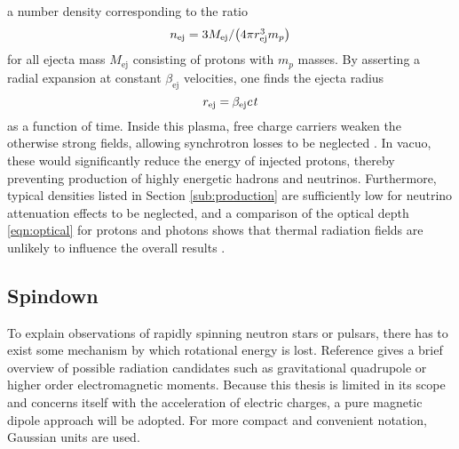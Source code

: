 a number density corresponding to the ratio
\begin{equation}
	\cramped{n_\text{ej} = 3 M_\text{ej} / \bigl( 4\pi r_\text{ej}^3 m_p \bigr)} \kern+0.5pt
	\label{eqn:number-density}
\end{equation}
for all ejecta mass $M_\text{ej}$ consisting of protons with $m_p$ masses. By asserting a radial expansion at constant
$\beta_\text{ej}$ velocities, one finds the ejecta radius
\begin{equation}
	r_\text{ej} = \kern-0.4pt \beta_\text{ej} \kern+0.1pt c \kern+1.0pt t
	\label{eqn:ejecta-radius}
\end{equation}
as a function of time. Inside this plasma, free charge carriers weaken the otherwise strong fields, allowing synchrotron losses to be
neglected \cite{Carpio_2020}. In vacuo, these would significantly reduce the energy of injected protons, thereby preventing production
of highly energetic hadrons and neutrinos. Furthermore, typical densities listed in Section \ref{sub:production} are sufficiently low for
neutrino attenuation effects to be neglected, and a comparison of the optical depth \eqref{eqn:optical} for protons and photons shows that
thermal radiation fields are unlikely to influence the overall results \cite{Carpio_2020}.


\enlargethispage*{2\baselineskip}\newpage


\subsection{Spindown}
\label{sub:spindown}

To explain observations of rapidly spinning neutron stars or pulsars, there has to exist some mechanism by which rotational energy is
lost. Reference \cite{Alvarez_2004} gives a brief overview of possible radiation candidates such as gravitational quadrupole or
higher order electromagnetic moments. Because this thesis is limited in its scope and concerns itself with the acceleration of
electric charges, a pure magnetic dipole approach will be adopted. For more compact and convenient notation, Gaussian units are used.

